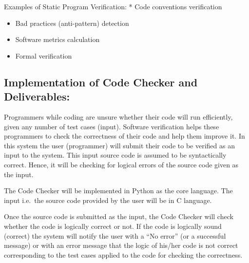 \documentclass[]{article}
\begin{document}
Examples of Static Program Verification: * Code conventions verification

\begin{itemize}
\item
  Bad practices (anti-pattern) detection
\item
  Software metrics calculation
\item
  Formal verification
\end{itemize}

\subsection{Implementation of Code Checker and
Deliverables:}\label{implementation-of-code-checker-and-deliverables}

Programmers while coding are unsure whether their code will run
efficiently, given any number of test cases (input). Software
verification helps these programmers to check the correctness of their
code and help them improve it. In this system the user (programmer) will
submit their code to be verified as an input to the system. This input
source code is assumed to be syntactically correct. Hence, it will be
checking for logical errors of the source code given as the input.

The Code Checker will be implemented in Python as the core language. The
input i.e.~the source code provided by the user will be in C language.

Once the source code is submitted as the input, the Code Checker will
check whether the code is logically correct or not. If the code is
logically sound (correct) the system will notify the user with a ``No
error'' (or a successful message) or with an error message that the
logic of his/her code is not correct corresponding to the test cases
applied to the code for checking the correctness.
\end{document}

